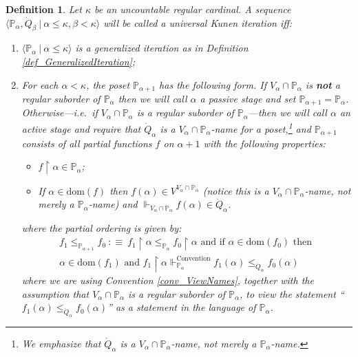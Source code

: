 \documentclass{amsart}
\newtheorem{definition}[theorem]{Definition}
\begin{document}
\begin{definition}\label{def_KunenIteration}
Let $\kappa$ be an uncountable regular cardinal.  A sequence $\langle \mathbb{P}_\alpha, \dot{Q}_\beta \ | \ \alpha \le \kappa, \beta < \kappa \rangle$ will be called a \emph{universal Kunen iteration} iff:
\begin{enumerate}
 \item $\langle \mathbb{P}_\alpha \ | \ \alpha \le \kappa \rangle$ is a generalized iteration as in Definition \ref{def_GeneralizedIteration};

 \item For each $\alpha < \kappa$, the poset $\mathbb{P}_{\alpha+1}$ has the following form.  If $V_\alpha \cap \mathbb{P}_\alpha$ is \textbf{not} a regular suborder of $\mathbb{P}_\alpha$ then we will call $\alpha$ a \emph{passive stage} and set $\mathbb{P}_{\alpha+1} = \mathbb{P}_\alpha$.  Otherwise---i.e.\ if $V_\alpha \cap \mathbb{P}_\alpha$ is a regular suborder of $\mathbb{P}_\alpha$---then we will call $\alpha$ an \emph{active stage} and require that $\dot{Q}_\alpha$ is a $V_\alpha \cap \mathbb{P}_\alpha$-name for a poset,\footnote{We emphasize that $\dot{Q}_\alpha$ is a $V_\alpha \cap \mathbb{P}_\alpha$-name, not merely a $\mathbb{P}_\alpha$-name.} and $\mathbb{P}_{\alpha+1}$ consists of all partial functions $f$ on $\alpha+1$ with the following properties:
 \begin{itemize}
  \item $f \restriction \alpha \in \mathbb{P}_\alpha$;
  \item If $\alpha \in \text{dom}(f)$ then $f(\alpha) \in V^{V_\alpha \cap \mathbb{P}_\alpha}$ (notice this is a $V_\alpha \cap \mathbb{P}_\alpha$-name, not merely a $\mathbb{P}_\alpha$-name) and $\Vdash_{V_\alpha \cap \mathbb{P}_\alpha} f(\alpha) \in \dot{Q}_\alpha$.
 \end{itemize}
where the partial ordering is given by: 
\begin{align*}
f_1 \le_{\mathbb{P}_{\alpha+1}} f_0 \ :\equiv \  f_1 \restriction \alpha \le_{\mathbb{P}_\alpha} f_0 \restriction \alpha \text{ and if } \alpha \in \text{dom}(f_0) \text{ then } \\
\alpha \in \text{dom}(f_1) \text{ and } f_1 \restriction \alpha \Vdash^{\text{Convention}}_{\mathbb{P}_\alpha} f_1(\alpha)  \le_{\dot{Q}_\alpha} f_0(\alpha)
\end{align*}
where we are using Convention \ref{conv_ViewNames}, together with the assumption that $V_\alpha \cap \mathbb{P}_\alpha$ is a regular suborder of $\mathbb{P}_\alpha$, to view the statement ``$f_1(\alpha)  \le_{\dot{Q}_\alpha} f_0(\alpha)$'' as a statement in the language of $\mathbb{P}_\alpha$.

\end{enumerate}
\end{definition}
\end{document}
